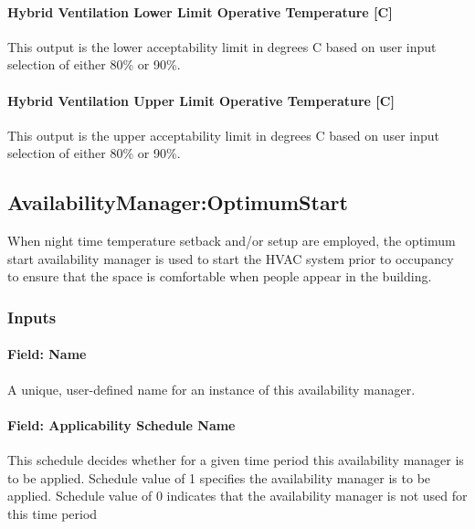 \paragraph{Hybrid Ventilation Lower Limit Operative Temperature {[C]}}\label{hybrid-ventilation-lower-limit-operative-temperature}

This output is the lower acceptability limit in degrees C based on user input selection of either 80\% or 90\%.

\paragraph{Hybrid Ventilation Upper Limit Operative Temperature {[C]}}\label{hybrid-ventilation-upper-limit-operative-temperature}

This output is the upper acceptability limit in degrees C based on user input selection of either 80\% or 90\%.

\subsection{AvailabilityManager:OptimumStart}\label{availabilitymanageroptimumstart}

When night time temperature setback and/or setup are employed, the optimum start availability manager is used to start the HVAC system prior to occupancy to ensure that the space is comfortable when people appear in the building.

\subsubsection{Inputs}\label{inputs-11-020}

\paragraph{Field: Name}\label{field-name-10-017}

A unique, user-defined name for an instance of this availability manager.

\paragraph{Field: Applicability Schedule Name}\label{field-applicability-schedule-name-2}

This schedule decides whether for a given time period this availability manager is to be applied. Schedule value of 1 specifies the availability manager is to be applied. Schedule value of 0 indicates that the availability manager is not used for this time period

